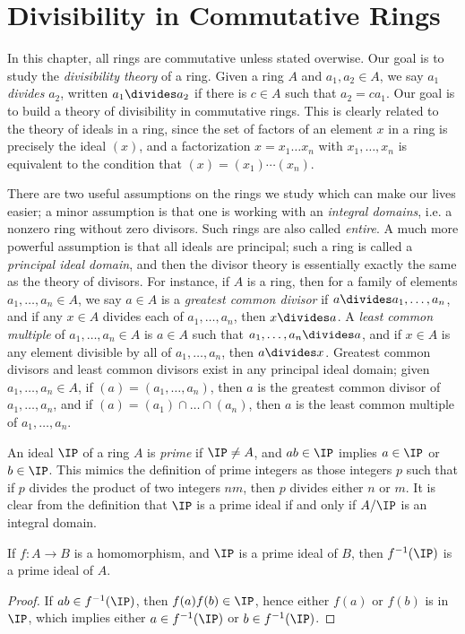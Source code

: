 \chapter{Divisibility in Commutative Rings}

In this chapter, all rings are commutative unless stated overwise. Our goal is to study the \emph{divisibility theory} of a ring. Given a ring $A$ and $a_1,a_2 \in A$, we say $a_1$ \emph{divides} $a_2$, written $a_1 \divides a_2$ if there is $c \in A$ such that $a_2 = ca_1$. Our goal is to build a theory of divisibility in commutative rings. This is clearly related to the theory of ideals in a ring, since the set of factors of an element $x$ in a ring is precisely the ideal $(x)$, and a factorization $x = x_1 \dots x_n$ with $x_1, \dots, x_n$ is equivalent to the condition that $(x) = (x_1) \cdots (x_n)$.

There are two useful assumptions on the rings we study which can make our lives easier; a minor assumption is that one is working with an \emph{integral domains}, i.e. a nonzero ring without zero divisors. Such rings are also called \emph{entire}. A much more powerful assumption is that all ideals are principal; such a ring is called a \emph{principal ideal domain}, and then the divisor theory is essentially exactly the same as the theory of divisors. For instance, if $A$ is a ring, then for a family of elements $a_1, \dots, a_n \in A$, we say $a \in A$ is a \emph{greatest common divisor} if $a \divides a_1, \dots, a_n$, and if any $x \in A$ divides each of $a_1, \dots, a_n$, then $x \divides a$. A \emph{least common multiple} of $a_1, \dots, a_n \in A$ is $a \in A$  such that $a_1, \dots, a_n \divides a$, and if $x \in A$ is any element divisible by all of $a_1, \dots, a_n$, then $a \divides x$. Greatest common divisors and least common divisors exist in any principal ideal domain; given $a_1, \dots, a_n \in A$, if $(a) = (a_1, \dots, a_n)$, then $a$ is the greatest common divisor of $a_1, \dots, a_n$, and if $(a) = (a_1) \cap \dots \cap (a_n)$, then $a$ is the least common multiple of $a_1, \dots, a_n$.

An ideal $\IP$ of a ring $A$ is \emph{prime} if $\IP \neq A$, and $ab \in \IP$ implies $a \in \IP$ or $b \in \IP$. This mimics the definition of prime integers as those integers $p$ such that if $p$ divides the product of two integers $nm$, then $p$ divides either $n$ or $m$. It is clear from the definition that $\IP$ is a prime ideal if and only if $A/\IP$ is an integral domain.

\begin{theorem}
    If $f: A \to B$ is a homomorphism, and $\IP$ is a prime ideal of $B$, then $f^{-1}(\IP)$ is a prime ideal of $A$.
\end{theorem}
\begin{proof}
    If $ab \in f^{-1}(\IP)$, then $f(a) f(b) \in \IP$, hence either $f(a)$ or $f(b)$ is in $\IP$, which implies either $a \in f^{-1}(\IP)$ or $b \in f^{-1}(\IP)$.
\end{proof}


